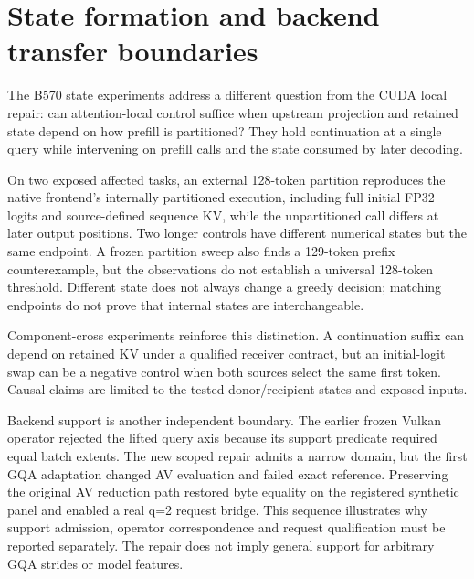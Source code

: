 \section{State formation and backend transfer boundaries}
\label{sec:transfer}
The B570 state experiments address a different question from the CUDA local repair: can attention-local control suffice when upstream projection and retained state depend on how prefill is partitioned? They hold continuation at a single query while intervening on prefill calls and the state consumed by later decoding.

On two exposed affected tasks, an external 128-token partition reproduces the native frontend's internally partitioned execution, including full initial FP32 logits and source-defined sequence KV, while the unpartitioned call differs at later output positions. Two longer controls have different numerical states but the same endpoint. A frozen partition sweep also finds a 129-token prefix counterexample, but the observations do not establish a universal 128-token threshold. Different state does not always change a greedy decision; matching endpoints do not prove that internal states are interchangeable.

Component-cross experiments reinforce this distinction. A continuation suffix can depend on retained KV under a qualified receiver contract, but an initial-logit swap can be a negative control when both sources select the same first token. Causal claims are limited to the tested donor/recipient states and exposed inputs.

Backend support is another independent boundary. The earlier frozen Vulkan operator rejected the lifted query axis because its support predicate required equal batch extents. The new scoped repair admits a narrow domain, but the first GQA adaptation changed AV evaluation and failed exact reference. Preserving the original AV reduction path restored byte equality on the registered synthetic panel and enabled a real q=2 request bridge. This sequence illustrates why support admission, operator correspondence and request qualification must be reported separately. The repair does not imply general support for arbitrary GQA strides or model features.
